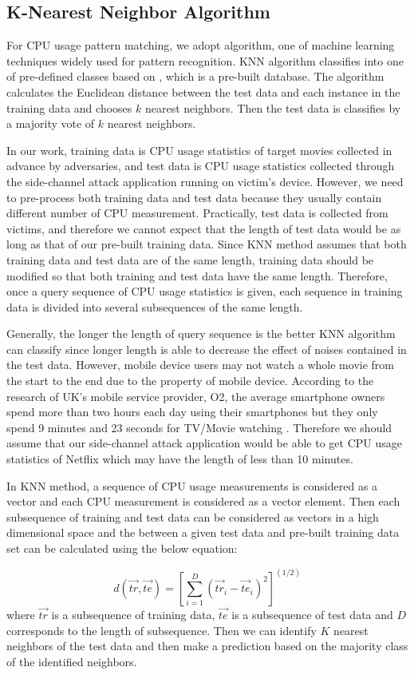 \subsection{K-Nearest Neighbor Algorithm}
\label{sec:knn} 

For CPU usage pattern matching, we adopt  algorithm, one of machine learning techniques widely used for pattern recognition.
KNN algorithm classifies  into one of pre-defined classes based on , which is a pre-built database. 
The algorithm calculates the Euclidean distance between the test data and each instance in the training data and chooses $k$ nearest neighbors.
Then the test data is classifies by a majority vote of $k$ nearest neighbors. 

In our work, training data is CPU usage statistics of target movies collected in advance by adversaries, and test data is CPU usage statistics collected through the side-channel attack application running on victim's device. 
However, we need to pre-process both training data and test data because they usually contain different number of CPU measurement.
Practically, test data is collected from victims, and therefore we cannot expect that the length of test data would be as long as that of our pre-built training data. 
Since KNN method assumes that both training data and test data are of the same length, training data should be modified so that both training and test data have the same length.
Therefore, once a query sequence of CPU usage statistics is given, each sequence in training data is divided into several subsequences of the same length. 

Generally, the longer the length of query sequence is the better KNN algorithm can classify since longer length is able to decrease the effect of noises contained in the test data.
However, mobile device users may not watch a whole movie from the start to the end due to the property of mobile device.
According to the research of UK's mobile service provider, O2, the average smartphone owners spend more than two hours each day using their smartphones but they only spend 9 minutes and 23 seconds for TV/Movie watching \cite{O2:2012}.
Therefore we should assume that our side-channel attack application would be able to get CPU usage statistics of Netflix which may have the length of less than 10 minutes.

In KNN method, a sequence of CPU usage measurements is considered as a vector and each CPU measurement is considered as a vector element. 
Then each subsequence of training and test data can be considered as vectors in a high dimensional space and the  between a given test data and pre-built training data set can be calculated using the below equation: 

\[
d( \vec{tr}, \vec{te} ) = [ \sum_{i=1}^{D} (\vec{tr}_i - \vec{te}_i)^2  ]^{(1/2)}
\]
where $\vec{tr}$ is a subsequence of training data, $\vec{te}$ is a subsequence of test data and $D$ corresponds to the length of subsequence. 
Then we can identify $K$ nearest neighbors of the test data and then make a prediction based on the majority class of the identified neighbors. 

